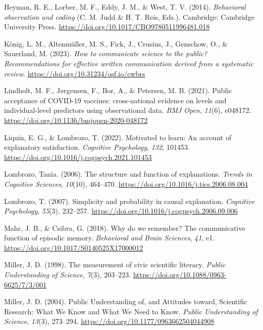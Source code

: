 \documentclass[
  doc,floatsintext]{apa6}
\newlength{\cslhangindent}
\newenvironment{CSLReferences}[2] %
 {\begin{list}{}{%
  \setlength{\itemindent}{0pt}
  \setlength{\leftmargin}{0pt}
  \setlength{\parsep}{0pt}
  \ifodd #1
   \setlength{\leftmargin}{\cslhangindent}
   \setlength{\itemindent}{-1\cslhangindent}
  \fi
  \setlength{\itemsep}{#2\baselineskip}}}
 {\end{list}}
\begin{document}
\begin{CSLReferences}{1}{0}
Heyman, R. E., Lorber, M. F., Eddy, J. M., \& West, T. V. (2014). \emph{Behavioral observation and coding} (C. M. Judd \& H. T. Reis, Eds.). Cambridge: Cambridge University Press. \url{https://doi.org/10.1017/CBO9780511996481.018}

König, L. M., Altenmüller, M. S., Fick, J., Crusius, J., Genschow, O., \& Sauerland, M. (2023). \emph{How to communicate science to the public? Recommendations for effective written communication derived from a systematic review}. \url{https://doi.org/10.31234/osf.io/cwbrs}

Lindholt, M. F., Jørgensen, F., Bor, A., \& Petersen, M. B. (2021). Public acceptance of COVID-19 vaccines: cross-national evidence on levels and individual-level predictors using observational data. \emph{BMJ Open}, \emph{11}(6), e048172. \url{https://doi.org/10.1136/bmjopen-2020-048172}

Liquin, E. G., \& Lombrozo, T. (2022). Motivated to learn: An account of explanatory satisfaction. \emph{Cognitive Psychology}, \emph{132}, 101453. \url{https://doi.org/10.1016/j.cogpsych.2021.101453}

Lombrozo, Tania. (2006). The structure and function of explanations. \emph{Trends in Cognitive Sciences}, \emph{10}(10), 464--470. \url{https://doi.org/10.1016/j.tics.2006.08.004}

Lombrozo, T. (2007). Simplicity and probability in causal explanation. \emph{Cognitive Psychology}, \emph{55}(3), 232--257. \url{https://doi.org/10.1016/j.cogpsych.2006.09.006}

Mahr, J. B., \& Csibra, G. (2018). Why do we remember? The communicative function of episodic memory. \emph{Behavioral and Brain Sciences}, \emph{41}, e1. \url{https://doi.org/10.1017/S0140525X17000012}

Miller, J. D. (1998). The measurement of civic scientific literacy. \emph{Public Understanding of Science}, \emph{7}(3), 203--223. \url{https://doi.org/10.1088/0963-6625/7/3/001}

Miller, J. D. (2004). Public Understanding of, and Attitudes toward, Scientific Research: What We Know and What We Need to Know. \emph{Public Understanding of Science}, \emph{13}(3), 273--294. \url{https://doi.org/10.1177/0963662504044908}


\end{CSLReferences}
\end{document}
